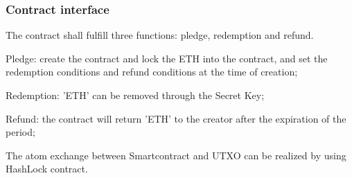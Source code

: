 \documentclass[a4paper,11pt]{article}
\begin{document}
\subsubsection*{Contract interface}

The contract shall fulfill three functions: pledge, redemption and refund.

Pledge: create the contract and lock the ETH into the contract, and set the redemption conditions and refund conditions at the time of creation;

Redemption: 'ETH' can be removed through the Secret Key;

Refund: the contract will return 'ETH' to the creator after the expiration of the period;


The atom exchange between Smartcontract and UTXO can be realized by using HashLock contract.




\clearpage



%
%


\end{document}

